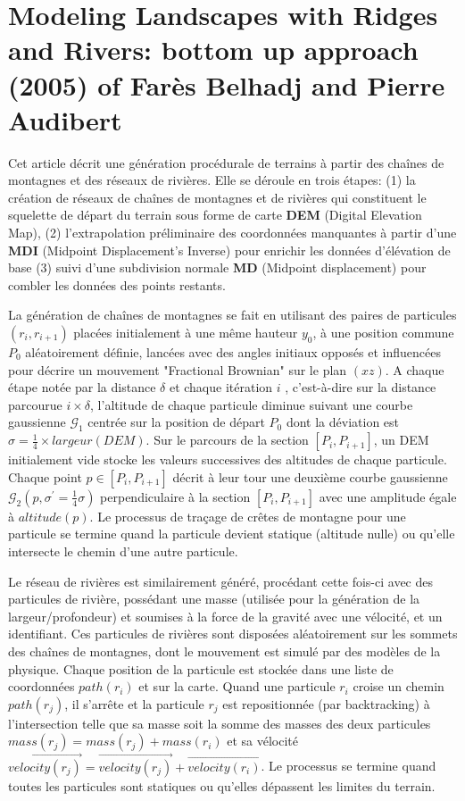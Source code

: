 \documentclass[11pt]{report}
\begin{document}
\part{Modeling Landscapes with Ridges and Rivers: bottom up approach (2005) of Farès Belhadj and Pierre Audibert}

Cet article décrit une génération procédurale de terrains à partir des chaînes de montagnes et des réseaux de rivières. Elle se déroule en trois étapes: (1) la création de réseaux de chaînes de montagnes et de rivières qui constituent le squelette de départ du terrain sous forme de carte \textbf{DEM} (Digital Elevation Map), (2) l'extrapolation préliminaire des coordonnées manquantes à partir d'une \textbf{MDI} (Midpoint Displacement's Inverse) pour enrichir les données d'élévation de base (3) suivi d'une subdivision normale \textbf{MD} (Midpoint displacement) pour combler les données des points restants.

La génération de chaînes de montagnes se fait en utilisant des paires de particules $(r_i, r_{i+1})$ placées initialement à une même hauteur $y_0$, à une position commune $P_{0}$ aléatoirement définie, lancées avec des angles initiaux opposés et influencées pour décrire un mouvement "Fractional Brownian" sur le plan $(xz)$. A chaque étape notée par la distance $\delta$ et chaque itération $i$ , c'est-à-dire sur la distance parcourue $i \times \delta$, l'altitude de chaque particule diminue suivant une courbe gaussienne $\mathcal{G}_1$ centrée sur la position de départ $P_{0}$ dont la déviation est $\sigma = \frac{1}{4} \times largeur(DEM)$. Sur le parcours de la section $[P_i, P_{i+1}]$, un DEM initialement vide stocke les valeurs successives des altitudes de chaque particule. Chaque point $p \in [P_i, P_{i+1}]$  décrit à leur tour une deuxième courbe gaussienne $\mathcal{G}_2(p, \sigma^{\prime} = \frac{1}{4}\sigma)$ perpendiculaire à la section $[P_i, P_{i+1}]$ avec une amplitude égale à $altitude(p)$. Le processus de traçage de crêtes de montagne pour une particule se termine quand la particule devient statique (altitude nulle) ou qu'elle intersecte le chemin d'une autre particule.

Le réseau de rivières est similairement généré, procédant cette fois-ci avec des particules de rivière, possédant une masse (utilisée pour la génération de la largeur/profondeur) et soumises à la force de la gravité avec une vélocité, et un identifiant. Ces particules de rivières sont disposées aléatoirement sur les sommets des chaînes de montagnes, dont le mouvement est simulé par des modèles de la physique. Chaque position de la particule est stockée dans une liste de coordonnées $path(r_i)$ et sur la carte. Quand une particule $r_i$ croise un chemin $path(r_j)$, il s'arrête et la particule $r_j$ est repositionnée (par backtracking) à l'intersection telle que sa masse soit la somme des masses des deux particules $mass(r_j) = mass(r_j) + mass(r_i)$ et sa vélocité $\overrightarrow{velocity(r_j)} = \overrightarrow{velocity(r_j)} + \overrightarrow{velocity(r_i)}$. Le processus se termine quand toutes les particules sont statiques ou qu'elles dépassent les limites du terrain.
\end{document}
